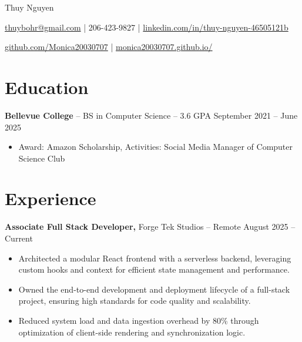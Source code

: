\documentclass[11pt]{article}       %
\begin{document}
\centerline{\Huge Thuy Nguyen}

\vspace{5pt}

\centerline{\href{mailto:thuybohr@gmail.com}{thuybohr@gmail.com} | 206-423-9827 |
\href{https://www.linkedin.com/in/thuy-nguyen-46505121b/}{linkedin.com/in/thuy-nguyen-46505121b}}

\centerline{\href{https://github.com/Monica20030707}{github.com/Monica20030707} | 
\href{https://monica20030707.github.io/}{monica20030707.github.io/}} 

\vspace{-9pt}

\section*{Education}
\textbf{Bellevue College} -- BS in Computer Science -- 3.6 GPA \hfill September 2021 -- June 2025\\
\vspace{-9pt}
\begin{itemize}
  \item Award: Amazon Scholarship, Activities: Social Media Manager of Computer Science Club
\end{itemize}

\vspace{-18.5pt}

\section*{Experience}

\textbf{Associate Full Stack Developer,} {Forge Tek Studios} -- Remote \hfill August 2025 -- Current 
\vspace{-9pt}
\begin{itemize}
  \item Architected a modular React frontend with a serverless backend, leveraging custom hooks and context for efficient state management and performance.
  \item Owned the end-to-end development and deployment lifecycle of a full-stack project, ensuring high standards for code quality and scalability.
  \item Reduced system load and data ingestion overhead by 80\% through optimization of client-side rendering and synchronization logic.
\end{itemize}
\end{document}
